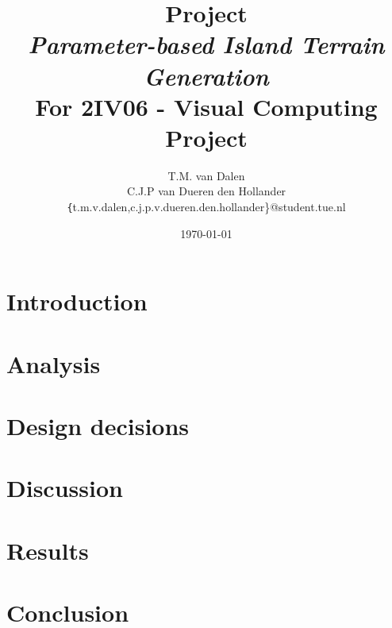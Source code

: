 \documentclass[11pt,a4paper,twocolumn]{article}
\title{
	{\huge Project\\ \emph{Parameter-based Island Terrain Generation}}\\
	{\large For 2IV06 - Visual Computing Project}
}
\author{
	T.M. van Dalen \\
	C.J.P van Dueren den Hollander\\
	{\texttt\{t.m.v.dalen,c.j.p.v.dueren.den.hollander\}}@student.tue.nl
}
\date{\today}
\begin{document}
	\maketitle
	
	
	
	\section{Introduction}
	\label{sec:intro}
	
	
	\section{Analysis}
	\label{sec:analysis}
	
	
	\section{Design decisions}
	\label{sec:choices}
	
	
	\section{Discussion}
	\label{sec:discussion}
	
	
	\section{Results}
	\label{sec:results}
	
	
	\section{Conclusion}
	\label{sec:conclusion}
	

	
	
\end{document}
